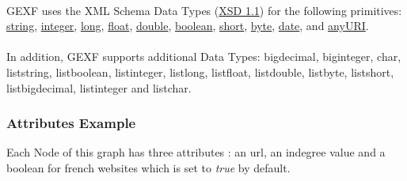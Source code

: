 \documentclass[a4paper,10pt]{article}
\begin{document}
\paragraph{}
GEXF uses the XML Schema Data Types (\href{http://www.w3.org/TR/xmlschema-2/}{XSD 1.1}) for the following primitives: \href{http://www.w3.org/TR/xmlschema-2/#string}{string}, \href{http://www.w3.org/TR/xmlschema-2/#integer}{integer}, \href{http://www.w3.org/TR/xmlschema-2/#long}{long}, \href{http://www.w3.org/TR/xmlschema-2/#float}{float}, \href{http://www.w3.org/TR/xmlschema-2/#double}{double}, \href{http://www.w3.org/TR/xmlschema-2/#boolean}{boolean}, \href{http://www.w3.org/TR/xmlschema-2/#short}{short}, \href{http://www.w3.org/TR/xmlschema-2/#byte}{byte}, \href{http://www.w3.org/TR/xmlschema-2/#date}{date}, and \href{http://www.w3.org/TR/xmlschema-2/#anyURI}{anyURI}.

\paragraph{}
In addition, GEXF supports additional Data Types: bigdecimal, biginteger, char, liststring, listboolean, listinteger, listlong, listfloat, listdouble, listbyte, listshort, listbigdecimal, listinteger and listchar.

\subsubsection{Attributes Example}

Each Node of this graph has three attributes : an url, an indegree value and a boolean for french websites which is set to \textit{true} by default.
\end{document}
